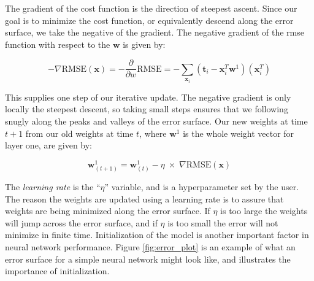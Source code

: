\documentclass[11pt]{article}
\begin{document}
The gradient of the cost function is the direction of steepest ascent. Since our goal is to minimize the cost function, or equivalently descend along the error surface, we take the negative of the gradient. The negative gradient of the rmse function with respect to the $\mathbf{w}$ is given by:

\begin{equation}
  - \nabla\mathrm{RMSE}(\mathbf{x}) = - \frac{\partial }{\partial w}\mathrm{RMSE} = - \sum_{\mathbf{x}_{i}} \left(\mathbf{t}_{i} -  \mathbf{x}_{i}^{T}\mathbf{w}^{1}\right)\left(\mathbf{x}_{i}^{T}\right)
\end{equation}

This supplies one step of our iterative update. The negative gradient is only locally the steepest descent, so taking small steps ensures that we following snugly along the peaks and valleys of the error surface. Our new weights at time $t+1$ from our old weights at time $t$, where $\mathbf{w}^{1}$ is the whole weight vector for layer one, are given by:

\begin{equation}\label{eq:weight_update}
  \mathbf{w}_{(t+1)}^{1} = \mathbf{w}_{(t)}^{1} - \eta\;\times\;\nabla\mathrm{RMSE}(\mathbf{x})
\end{equation}

The \emph{learning rate} is the ``$\eta$'' variable, and is a hyperparameter set by the user. The reason the weights are updated using a learning rate is to assure that weights are being minimized along the error surface. If $\eta$ is too large the weights will jump across the error surface, and if $\eta$ is too small the error will not minimize in finite time. Initialization of the model is another important factor in neural network performance. Figure \ref{fig:error_plot} is an example of what an error surface for a simple neural network might look like, and illustrates the importance of initialization.  
\end{document}
